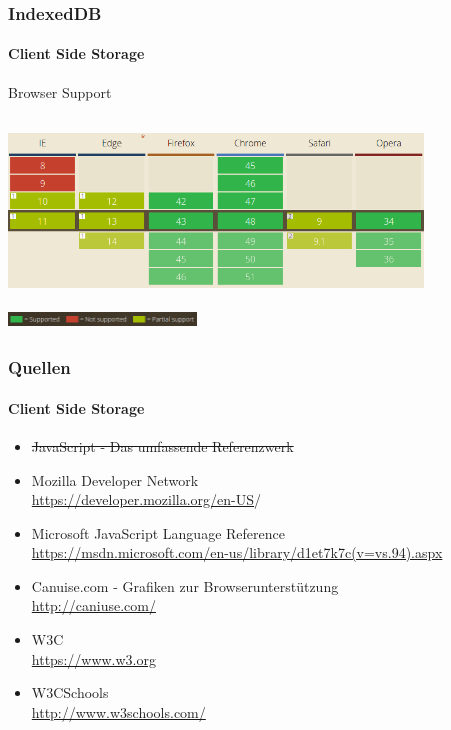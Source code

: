 \begin{frame}[fragile]
\frametitle{IndexedDB}
\framesubtitle{Client Side Storage}
	Browser Support
	\begin{center}
		\includegraphics[height=5cm,width=11cm]{img/indexedDB-support.png}
		\\
		\includegraphics[height=0.5cm,width=5cm]{img/legende.png}
	\end{center}
\end{frame}
\begin{frame}
\frametitle{Quellen}
\framesubtitle{Client Side Storage}

\begin{itemize}
	\item 	\st{JavaScript - Das umfassende Referenzwerk}
	\item Mozilla Developer Network \\
		{\small \url{https://developer.mozilla.org/en-US}/}
	\item Microsoft JavaScript Language Reference \\
		{\small \url{https://msdn.microsoft.com/en-us/library/d1et7k7c(v=vs.94).aspx}}
	\item Canuise.com - Grafiken zur Browserunterstützung \\
		{\small \url{http://caniuse.com/}}
	\item W3C \\
		{\small \url{https://www.w3.org}}
	\item W3CSchools \\
		{\small \url{http://www.w3schools.com/}}	
\end{itemize}
\end{frame}
